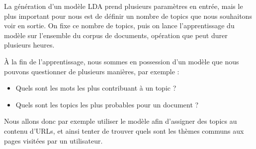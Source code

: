			La génération d'un modèle LDA prend plusieurs paramètres en entrée, mais le plus important pour nous est de définir un nombre de topics que nous souhaitons voir en sortie. On fixe ce nombre de topics, puis on lance l'apprentissage du modèle sur l'ensemble du corpus de documents, opération que peut durer plusieurs heures.

			À la fin de l'apprentissage, nous sommes en possession d'un modèle que nous pouvons questionner de plusieurs manières, par exemple :
			\begin{itemize}
				\item Quels sont les mots les plus contribuant à un topic ?
				\item Quels sont les topics les plus probables pour un document ?
			\end{itemize}

			Nous allons donc par exemple utiliser le modèle afin d'assigner des topics au contenu d'URLs, et ainsi tenter de trouver quels sont les thèmes communs aux pages visitées par un utilisateur.